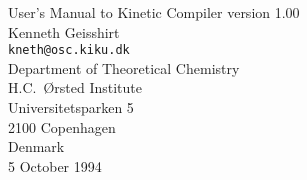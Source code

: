 \parindent=0cm
\newcommand{\ie}{{\em i.e.}}
\newcommand{\eg}{{\em e.g.}}
\newcommand{\etc}{{\em etc.}}
\newcommand{\diff}[2]{\frac{{\mathrm d}#1}{{\mathrm d}#2}}

\begin{titlepage}
\begin{center}
{\Large
User's Manual to Kinetic Compiler version 1.00 } \\

\vspace{5cm}
Kenneth Geisshirt \\
{\footnotesize {\tt kneth@osc.kiku.dk}} \\
Department of Theoretical Chemistry \\
H.C.\ {\O}rsted Institute \\
Universitetsparken 5 \\
2100 Copenhagen \\
Denmark \\

\vspace{3cm}
{\footnotesize 5 October 1994}
\end{center}
\end{titlepage}

\tableofcontents
\newpage








